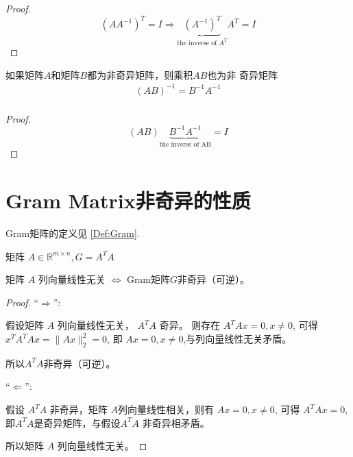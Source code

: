 \begin{proof}
    \begin{equation}\left(A A^{-1}\right)^{T}=I \Rightarrow \underbrace{\left(A^{-1}\right)^{T}}_{\text{the inverse of }A^T}   A^{T}=I\end{equation}
\end{proof}

\begin{corollary}
    如果矩阵$A$和矩阵$B$都为非奇异矩阵，则乘积$AB$也为非 奇异矩阵
\begin{equation}
\begin{array}{l}
(A B)^{-1}=B^{-1} A^{-1} \\
\end{array}
\end{equation}
\end{corollary}

\begin{proof}
    \begin{equation}(A B) \underbrace{B^{-1} A^{-1}} _{\text{the inverse of AB}}=I\end{equation}
\end{proof}

\section{Gram Matrix非奇异的性质}

\label{Sect:GramNonSingular}

Gram矩阵的定义见 \ref{Def:Gram}.

\begin{corollary}
    矩阵 $ A \in \mathbb{R}^{m \times n},   {G}=A^{T} A $

矩阵 $ A $ 列向量线性无关 $ \Leftrightarrow $ Gram矩阵$G$非奇异（可逆）。
\end{corollary}

\begin{proof}
    “$ \Rightarrow $”: 
    
    假设矩阵 $ A $ 列向量线性无关， $ A^{T} A $ 奇异。  则存在 $ A^{T} A x=0, x \neq 0 $, 可得 $ x^{T} A^{T} A x=\|A x\|_{2}^{2}=0 $, 即 $ A x=0 , x \neq 0$,与列向量线性无关矛盾。

    所以$ A^{T} A $非奇异（可逆）。

    “$ \Leftarrow $”:
    
    假设 $ A^{T} A $ 非奇异，矩阵 $ A $列向量线性相关，则有 $ A x=0, x \neq 0 $, 可得 $ A^{T} A x=0 $, 即$ A^{T} A $是奇异矩阵，与假设$ A^{T} A $ 非奇异相矛盾。
    
    所以矩阵 $ A $ 列向量线性无关。
\end{proof}

